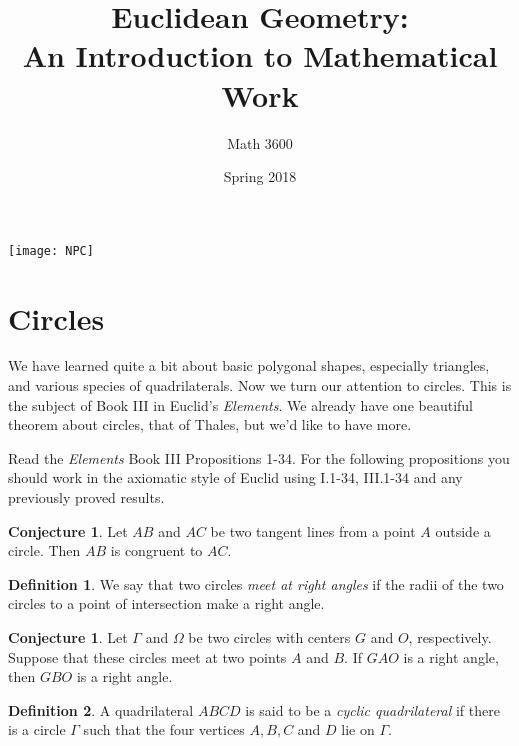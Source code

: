 \documentclass{tufte-handout}
\title{Euclidean Geometry:\\An Introduction to Mathematical Work}
\author[]{Math 3600}
\date{Spring 2018}
\theoremstyle{definition}
\newtheorem{conjecture}[problem]{Conjecture}
\newtheorem*{definition}{Definition}
\begin{document}
\maketitle

\begin{marginfigure}
    \texttt{[image: NPC]}
\end{marginfigure}

\setcounter{section}{9}
\section{Circles}

We have learned quite a bit about basic polygonal shapes, especially triangles, and various species of quadrilaterals. Now we turn our attention to circles. This is the subject of Book III in Euclid's \emph{Elements}. We already have one beautiful theorem about circles, that of Thales, but we'd like to have more.


Read the \emph{Elements} Book III Propositions 1-34. For the following propositions you should work in the axiomatic style of Euclid using I.1-34,  III.1-34 and any previously proved results.



\begin{conjecture}\label{conj:tangents-to-circle}
Let $AB$ and $AC$ be two tangent lines from a point $A$ outside a circle. Then $AB$ is congruent to $AC$.
\end{conjecture}

\begin{definition}\label{defn:circles-perp}
We say that two circles \emph{meet at right angles} if the radii of the two circles to a point of intersection make a right angle.
\end{definition}

\begin{conjecture}\label{conj:perp-circles}
Let $\Gamma$ and $\Omega$ be two circles with centers $G$ and $O$, respectively. Suppose that these circles meet at two points $A$ and $B$. If $GAO$ is a right angle, then $GBO$ is a right angle.
\end{conjecture}


\begin{definition}\label{defn:cyclic-quad}
A quadrilateral $ABCD$ is said to be a \emph{cyclic quadrilateral} if there is a circle $\Gamma$ such that the four vertices $A,B,C$ and $D$ lie on $\Gamma$.
\end{definition}
\end{document}
